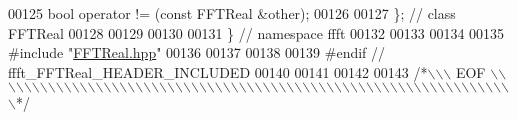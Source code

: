 \begin{DoxyCode}
00125     \textcolor{keywordtype}{bool}                operator != (\textcolor{keyword}{const} FFTReal &other);
00126 
00127 \};  \textcolor{comment}{// class FFTReal}
00128 
00129 
00130 
00131 \}   \textcolor{comment}{// namespace ffft}
00132 
00133 
00134 
00135 \textcolor{preprocessor}{#include    "\hyperlink{a00096}{FFTReal.hpp}"}
00136 
00137 
00138 
00139 \textcolor{preprocessor}{#endif  // ffft\_FFTReal\_HEADER\_INCLUDED}
00140 
00141 
00142 
00143 \textcolor{comment}{/*\(\backslash\)\(\backslash\)\(\backslash\) EOF \(\backslash\)\(\backslash\)\(\backslash\)\(\backslash\)\(\backslash\)\(\backslash\)\(\backslash\)\(\backslash\)\(\backslash\)\(\backslash\)\(\backslash\)\(\backslash\)\(\backslash\)\(\backslash\)\(\backslash\)\(\backslash\)\(\backslash\)\(\backslash\)\(\backslash\)\(\backslash\)\(\backslash\)\(\backslash\)\(\backslash\)\(\backslash\)\(\backslash\)\(\backslash\)\(\backslash\)\(\backslash\)\(\backslash\)\(\backslash\)\(\backslash\)\(\backslash\)\(\backslash\)\(\backslash\)\(\backslash\)\(\backslash\)\(\backslash\)\(\backslash\)\(\backslash\)\(\backslash\)\(\backslash\)\(\backslash\)\(\backslash\)\(\backslash\)\(\backslash\)\(\backslash\)\(\backslash\)\(\backslash\)\(\backslash\)\(\backslash\)\(\backslash\)\(\backslash\)\(\backslash\)\(\backslash\)\(\backslash\)\(\backslash\)\(\backslash\)\(\backslash\)\(\backslash\)\(\backslash\)\(\backslash\)\(\backslash\)\(\backslash\)\(\backslash\)\(\backslash\)\(\backslash\)*/}
\end{DoxyCode}
